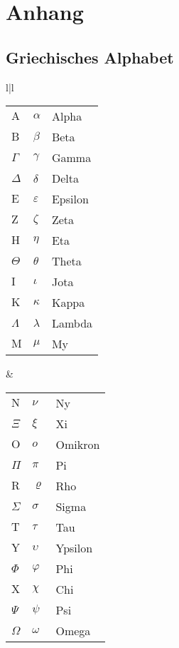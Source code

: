 
\chapter{Anhang}
\section{Griechisches Alphabet}

\begin{tabular}{l|l}
\begin{tabular}[t]{lll}
$\mathrm A$ & $\alpha$   & Alpha\\
$\mathrm B$ & $\beta$    & Beta\\
$\Gamma$    & $\gamma$   & Gamma\\
$\Delta$    & $\delta$   & Delta\\
\noalign{\vspace{1em}}
$\mathrm E$ & $\varepsilon$ & Epsilon\\
$\mathrm Z$ & $\zeta$    & Zeta\\
$\mathrm H$ & $\eta$     & Eta\\
$\Theta$    & $\theta$   & Theta\\
\noalign{\vspace{1em}}
$\mathrm I$ & $\iota$    & Jota\\
$\mathrm K$ & $\kappa$   & Kappa\\
$\Lambda$   & $\lambda$  & Lambda\\
$\mathrm M$ & $\mu$      & My
\end{tabular}
&
\begin{tabular}[t]{lll}
$\mathrm N$ & $\nu$      & Ny\\
$\Xi$       & $\xi$      & Xi\\
$\mathrm O$ & $o$        & Omikron\\
$\Pi$       & $\pi$      & Pi\\
\noalign{\vspace{1em}}
$\mathrm R$ & $\varrho$  & Rho\\
$\Sigma$    & $\sigma$   & Sigma\\
$\mathrm T$ & $\tau$     & Tau\\
$\mathrm Y$ & $\upsilon$ & Ypsilon\\
\noalign{\vspace{1em}}
$\Phi$      & $\varphi$  & Phi\\
$\mathrm X$ & $\chi$     & Chi\\
$\Psi$      & $\psi$     & Psi\\
$\Omega$    & $\omega$   & Omega 
\end{tabular}
\end{tabular}

